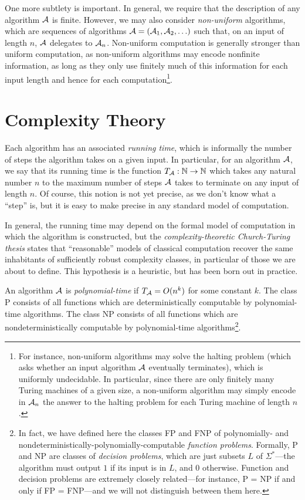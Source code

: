 One more subtlety is important. In general, we require that the description of
any algorithm $\mathcal{A}$ is finite. However, we may also consider \emph{non-uniform}
algorithms, which are sequences of algorithms $\mathcal{A} = (\mathcal{A}_1, \mathcal{A}_2, \ldots)$
such that, on an input of length $n$, $\mathcal{A}$ delegates to $\mathcal{A}_n$. Non-uniform
computation is generally stronger than uniform computation, as non-uniform
algorithms may encode nonfinite information, as long as they only use finitely
much of this information for each input length and hence for each
computation\footnote{
  For instance, non-uniform algorithms may solve the halting problem (which asks
  whether an input algorithm $\mathcal{A}$ eventually terminates), which is uniformly
  undecidable. In particular, since there are only finitely many Turing machines
  of a given size, a non-uniform algorithm may simply encode in $\mathcal{A}_n$ the
  answer to the halting problem for each Turing machine of length $n$.
}.

\section{Complexity Theory}

Each algorithm has an associated \emph{running time}, which is informally the
number of steps the algorithm takes on a given input. In particular, for an
algorithm $\mathcal{A}$, we say that its running time is the function $T_{\mathcal{A}}: \mathbb{N}\to\mathbb{N}$
which takes any natural number $n$ to the maximum number of steps $\mathcal{A}$ takes to
terminate on any input of length $n$. Of course, this notion is not yet precise,
as we don't know what a ``step'' is, but it is easy to make precise in any
standard model of computation.

In general, the running time may depend on the formal model of computation in
which the algorithm is constructed, but the \emph{complexity-theoretic
Church-Turing thesis} states that ``reasonable'' models of classical computation
recover the same inhabitants of sufficiently robust complexity classes, in
particular of those we are about to define. This hypothesis is a heuristic, but
has been born out in practice.

\begin{dfn}
  An algorithm $\mathcal{A}$ is \emph{polynomial-time} if $T_{\mathcal{A}} = O(n^k)$ for some
  constant $k$. The class P consists of all functions which are
  deterministically computable by polynomial-time algorithms. The class NP
  consists of all functions which are nondeterministically computable by
  polynomial-time algorithms\footnote{
    In fact, we have defined here the classes FP and FNP of polynomially- and
    nondeterministically-polynomially-computable \emph{function problems}.
    Formally, P and NP are classes of \emph{decision problems}, which are just
    subsets $L$ of $\Sigma^*$---the algorithm must output $1$ if its input is in
    $L$, and $0$ otherwise. Function and decision problems are extremely closely
    related---for instance, P = NP if and only if FP = FNP---and we will not
    distinguish between them here.
  }.
\end{dfn}

